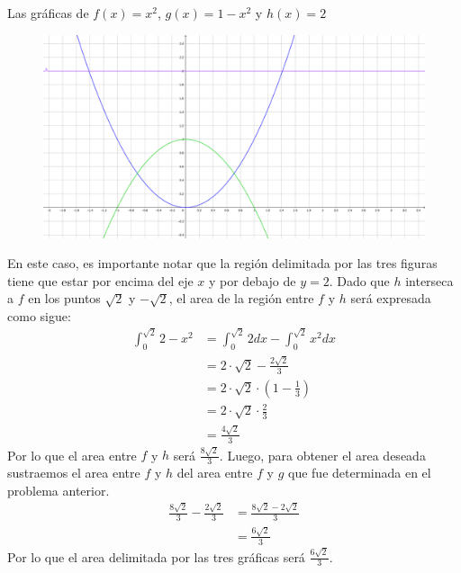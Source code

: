 \documentclass[../../main.tex]{subfiles}
\begin{document}
\begin{partes}
    \parte Las gráficas de $f(x) = x^2$, $g(x) = 1-x^2$ y $h(x) = 2$\\
    \begin{figure}[h]
        \centering
        \includegraphics[width=12cm]{Parte 1/grafica4.png}
    \end{figure}
    En este caso, es importante notar que la región delimitada por las tres figuras tiene que estar por encima del eje $x$ y por debajo de
    $y=2$. Dado que $h$ interseca a $f$ en los puntos $\sqrt{2}$ y $-\sqrt{2}$, el area de la región entre $f$ y $h$ será expresada como sigue:
    \begin{align*}
        \int_{0}^{\sqrt{2}} 2-x^2 &= \int_{0}^{\sqrt{2}} 2 dx- \int_{0}^{\sqrt{2}} x^2 dx\\
        &= 2 \cdot \sqrt{2} - \frac{2\sqrt{2}}{3}\\
        &= 2\cdot \sqrt{2} \cdot \left(1 - \frac{1}{3}\right)\\
        &= 2\cdot \sqrt{2} \cdot \frac{2}{3}\\
        &= \frac{4\sqrt{2}}{3}
    \end{align*}
    Por lo que el area entre $f$ y $h$ será $\frac{8\sqrt{2}}{3}$. Luego, para obtener el area deseada sustraemos el area entre $f$ y $h$ del area
    entre $f$ y $g$ que fue determinada en el problema anterior.
    \begin{align*}
        \frac{8\sqrt{2}}{3} - \frac{2\sqrt{2}}{3} &= \frac{8\sqrt{2} - 2\sqrt{2}}{3}\\
        &= \frac{6\sqrt{2}}{3}
    \end{align*}
    Por lo que el area delimitada por las tres gráficas será $\frac{6\sqrt{2}}{3}$.


\end{partes}
\end{document}
